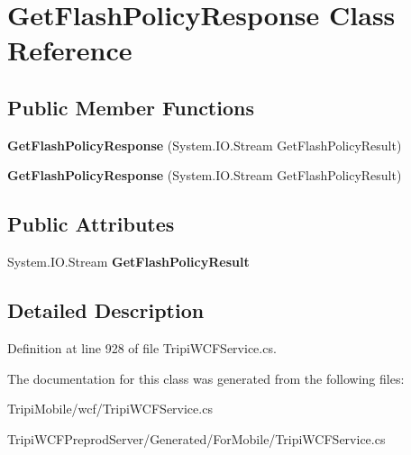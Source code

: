 \hypertarget{class_get_flash_policy_response}{
\section{GetFlashPolicyResponse Class Reference}
\label{class_get_flash_policy_response}
}
\subsection*{Public Member Functions}
\begin{DoxyCompactItemize}
\item 
\hypertarget{class_get_flash_policy_response_ab1318d7bc5d5c4360fb06c47c51aef2e}{
{\bfseries GetFlashPolicyResponse} (System.IO.Stream GetFlashPolicyResult)}
\label{class_get_flash_policy_response_ab1318d7bc5d5c4360fb06c47c51aef2e}

\item 
\hypertarget{class_get_flash_policy_response_ab1318d7bc5d5c4360fb06c47c51aef2e}{
{\bfseries GetFlashPolicyResponse} (System.IO.Stream GetFlashPolicyResult)}
\label{class_get_flash_policy_response_ab1318d7bc5d5c4360fb06c47c51aef2e}

\end{DoxyCompactItemize}
\subsection*{Public Attributes}
\begin{DoxyCompactItemize}
\item 
\hypertarget{class_get_flash_policy_response_ae580b5489fe4c224af94656539be2100}{
System.IO.Stream {\bfseries GetFlashPolicyResult}}
\label{class_get_flash_policy_response_ae580b5489fe4c224af94656539be2100}

\end{DoxyCompactItemize}


\subsection{Detailed Description}


Definition at line 928 of file TripiWCFService.cs.

The documentation for this class was generated from the following files:\begin{DoxyCompactItemize}
\item 
TripiMobile/wcf/TripiWCFService.cs\item 
TripiWCFPreprodServer/Generated/ForMobile/TripiWCFService.cs\end{DoxyCompactItemize}
